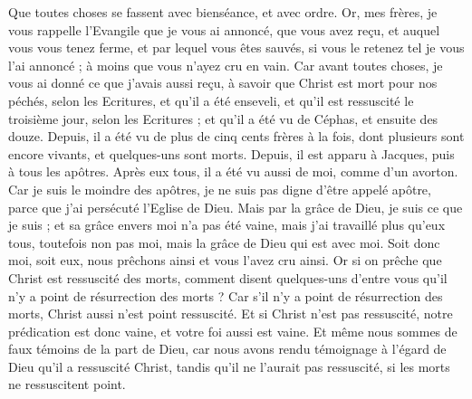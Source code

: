 \begin{multicols}{2}
Que toutes choses se fassent avec bienséance, et avec ordre.
\VerseOne{}Or, mes frères, je vous rappelle l'Evangile que je vous ai annoncé, que vous avez reçu, et auquel vous vous tenez ferme,
et par lequel vous êtes sauvés, si vous le retenez tel je vous l'ai annoncé ; à moins que vous n'ayez cru en vain. 
Car avant toutes choses, je vous ai donné ce que j'avais aussi reçu, à savoir que Christ est mort pour nos péchés, selon les Ecritures,
et qu'il a été enseveli, et qu'il est ressuscité le troisième jour, selon les Ecritures ;
et qu'il a été vu de Céphas, et ensuite des douze.
Depuis, il a été vu de plus de cinq cents frères à la fois, dont plusieurs sont encore vivants, et quelques-uns sont morts.
Depuis, il est apparu à Jacques, puis à tous les apôtres.
Après eux tous, il a été vu aussi de moi, comme d'un avorton.
Car je suis le moindre des apôtres, je ne suis pas digne d'être appelé apôtre, parce que j'ai persécuté l'Eglise de Dieu.
Mais par la grâce de Dieu, je suis ce que je suis ; et sa grâce envers moi n'a pas été vaine, mais j'ai travaillé plus qu'eux tous, toutefois non pas moi, mais la grâce de Dieu qui est avec moi.
Soit donc moi, soit eux, nous prêchons ainsi et vous l'avez cru ainsi.
Or si on prêche que Christ est ressuscité des morts, comment disent quelques-uns d'entre vous qu'il n'y a point de résurrection des morts ?
Car s'il n'y a point de résurrection des morts, Christ aussi n'est point ressuscité.
Et si Christ n'est pas ressuscité, notre prédication est donc vaine, et votre foi aussi est vaine.
Et même nous sommes de faux témoins de la part de Dieu, car nous avons rendu témoignage à l’égard de Dieu qu'il a ressuscité Christ, tandis qu’il ne l’aurait pas ressuscité, si les morts ne ressuscitent point.

\end{multicols}
